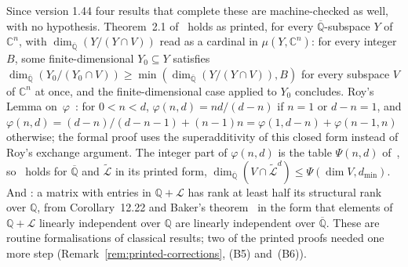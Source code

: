 \documentclass[11pt,a4paper]{article}
\theoremstyle{plain}
\theoremstyle{definition}
\newcommand{\C}{\mathbb{C}}
\newcommand{\Q}{\mathbb{Q}}
\newcommand{\Alg}{\overline{\mathbb{Q}}}
\newcommand{\Logs}{\mathcal{L}}
\newcommand{\aLogs}{\widetilde{\mathcal{L}}}
\begin{document}
Since version 1.44 four results that complete these are machine-checked as well, with no hypothesis.
Theorem~2.1 of~\cite{waldschmidt-2005b} holds as printed, for every $\Alg$-subspace $Y$ of $\C^{n}$, with
$\dim_{\Alg}(Y/(Y\cap V))$ read as a cardinal in $\mu(Y,\C^{n})$: for every integer $B$, some finite-dimensional
$Y_{0}\subseteq Y$ satisfies $\dim_{\Alg}(Y_{0}/(Y_{0}\cap V))\geq\min(\dim_{\Alg}(Y/(Y\cap V)),B)$ for every
subspace $V$ of $\C^{n}$ at once, and the finite-dimensional case applied to $Y_{0}$ concludes. Roy's Lemma
on~$\varphi$~\cite[p.~40]{roy-1992}: for $0<n<d$, $\varphi(n,d)=nd/(d-n)$ if $n=1$ or $d-n=1$, and
$\varphi(n,d)=(d-n)/(d-n-1)+(n-1)n=\varphi(1,d-n)+\varphi(n-1,n)$ otherwise; the formal proof uses the
superadditivity of this closed form instead of Roy's exchange argument. The integer part of $\varphi(n,d)$ is the
table $\Psi(n,d)$ of~\cite[p.~394]{waldschmidt-book}, so~\cite[Corollary~11.15]{waldschmidt-book} holds for $\Alg$
and $\aLogs$ in its printed form, $\dim_{\Alg}(V\cap\aLogs^{d})\leq\Psi(\dim V,d_{\min})$. And
\cite[Corollary~12.23]{waldschmidt-book}: a matrix with entries in $\Q+\Logs$ has rank at least half its structural
rank over $\Q$, from Corollary~12.22 and Baker's theorem~\cite{baker-1966} in the form that elements of $\Q+\Logs$
linearly independent over $\Q$ are linearly independent over $\Alg$. These are routine formalisations of classical
results; two of the printed proofs needed one more step (Remark~\ref{rem:printed-corrections}, (B5) and~(B6)).
\end{document}
